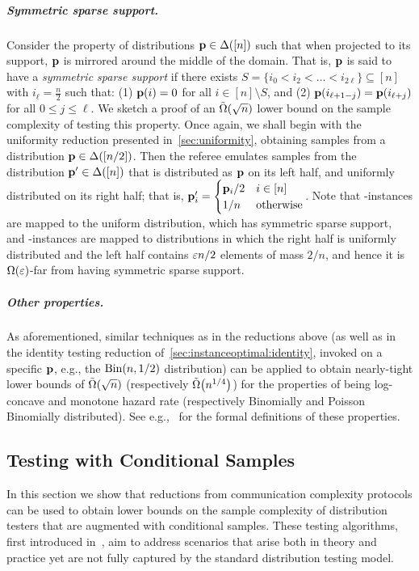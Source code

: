 \subparagraph{Symmetric sparse support.} Consider the property of distributions $\mathbf{p}\in\Delta\!\left([n]\right)$ such that when projected to its support, $\mathbf{p}$ is mirrored around the middle of the domain. That is, $\mathbf{p}$ is said to have a \emph{symmetric sparse support} if there exists $S=\{i_0 < i_2 < \dots< i_{2\ell}\}\subseteq [n]$ with $i_\ell = \frac{n}{2}$ such that: (1) $\mathbf{p}(i)=0$ for all $i\in[n]\setminus S$, and (2) $\mathbf{p}(i_{\ell+1-j}) = \mathbf{p}(i_{\ell+j})$ for all $0\leq j \leq \ell$. We sketch a proof of an $\tildeOmega{\sqrt{n}}$ lower bound on the sample complexity of testing this property. Once again, we shall begin with the uniformity reduction presented in~\cref{sec:uniformity}, obtaining samples from a distribution $\mathbf{p} \in \Delta\!\left([n/2]\right)$. Then the referee emulates samples from the distribution $\mathbf{p}'\in\Delta\!\left([n]\right)$ that is distributed as $\mathbf{p}$ on its left half, and uniformly distributed on its right half; that is, $\mathbf{p}'_i = \begin{cases}
	\mathbf{p}_i/2 & i\in[n] \\
	1/n & \text{otherwise}
 \end{cases}$.
 Note that \yes-instances are mapped to the uniform distribution, which has symmetric sparse support, and \no-instances are mapped to distributions in which the right half is uniformly distributed and the left half contains $\varepsilon n/2$ elements of mass $2/n$, and hence it is $\bigOmega{\eps}$-far from having symmetric sparse support.
 
\subparagraph{Other properties.} As aforementioned, similar techniques as in the reductions above (as well as in the identity testing reduction of~\cref{sec:instanceoptimal:identity}, invoked on a specific $\mathbf{p}$, e.g., the $\operatorname{Bin}\!\left( n, 1/2 \right)$ distribution) can be applied to obtain nearly-tight lower bounds of $\tildeOmega{\sqrt{n}}$ (respectively $\tildeOmega{n^{1/4}}$) for the properties of being log-concave and monotone hazard rate (respectively Binomially and Poisson Binomially distributed). See e.g.,~\cite{CDGR:16} for the formal definitions of these properties.
 
\subsection{Testing with Conditional Samples}\label{sec:extensions}



In this section we show that reductions from communication complexity protocols can be used to obtain lower bounds on the sample complexity of distribution testers that are augmented with conditional samples. These testing algorithms, first introduced in~\cite{CFGM:13,CRS:14}, aim to address scenarios that arise both in theory and practice yet are not fully captured by the standard distribution testing model.

